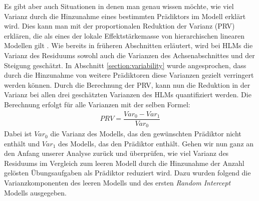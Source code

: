 \documentclass[12pt, a4paper]{article}\usepackage[]{graphicx}\usepackage[]{color}
\begin{document}
Es gibt aber auch Situationen in denen man genau wissen möchte, wie viel Varianz durch die Hinzunahme eines bestimmten Prädiktors im Modell erklärt wird. Dies kann man mit der proportionalen Reduktion der Varianz (PRV) erklären, die als eines der lokale Effektstärkemasse von hierarchischen linearen Modellen gilt \citep{PEUGH201085, woltman2012introduction}. Wie bereits in früheren Abschnitten erläutert, wird bei HLMs die Varianz des Residuums sowohl auch die Varianzen des Achsenabschnittes und der Steigung geschätzt. In Abschnitt \ref{section:variability} wurde angesprochen, dass durch die Hinzunahme von weitere Prädiktoren diese Varianzen gezielt verringert werden können. Durch die Berechnung der PRV, kann nun die Reduktion in der Varianz bei allen drei geschätzten Varianzen des HLMs quantifiziert werden. Die Berechnung erfolgt für alle Varianzen mit der selben Formel:
\begin{equation} \label{eq:prv}
\begin{split}	
 PRV = \dfrac{Var_{0} - Var_{1}}{Var_{0}}
\end{split}	
\end{equation}
Dabei ist $Var_{0}$ die Varianz des Modells, das den gewünschten Prädiktor nicht enthält und $Var_{1}$ des Modells, das den Prädiktor enthält. Gehen wir nun ganz an den Anfang unserer Analyse zurück und überprüfen, wie viel Varianz des Residuums im Vergleich zum leeren Modell durch die Hinzunahme der Anzahl gelösten Übungsaufgaben als Prädiktor reduziert wird. Dazu wurden folgend die Varianzkomponenten des leeren Modells und des ersten \textit{Random Intercept} Modells ausgegeben. 
\end{document}
